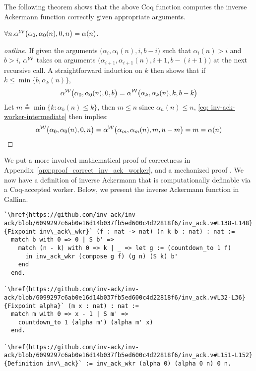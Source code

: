 The following theorem shows that the above Coq function computes the inverse Ackermann function correctly given appropriate arguments.
\begin{thm} \label{thm: inv-ack-worker-correct}
	$\forall n. \alpha^{\mathcal{W}}\big(\alpha_0, \alpha_0(n), 0, n\big) = \alpha(n)$.
\end{thm}
\begin{proof}[outline]
	If given the arguments $\big(\alpha_i, \alpha_i(n), i, b - i\big)$ such that $\alpha_i(n) > i$ and $b > i$, $\alpha^{\mathcal{W}}$ takes on arguments $\big(\alpha_{i+1}, \alpha_{i+1}(n), i+1, b - (i+1)\big)$ at the next recursive call. A straightforward induction on $k$ then shows that if $k\le \min\big\{b, \alpha_k(n)\big\}$, 
	\begin{equation} \label{eq: inv-ack-worker-intermediate}
	\alpha^{\mathcal{W}}\big(\alpha_0, \alpha_0(n), 0, b\big) = \alpha^{\mathcal{W}}\big(\alpha_k, \alpha_k(n), k, b-k\big)
	\end{equation}
	Let $m \triangleq \min\big\{k : \alpha_k(n) \le k \}$, then $m\le n$ since $\alpha_n(n)\le n$, \eqref{eq: inv-ack-worker-intermediate} then implies:
	$$ \alpha^{\mathcal{W}}\big(\alpha_0, \alpha_0(n), 0, n\big) = \alpha^{\mathcal{W}}\big(\alpha_m, \alpha_m(n), m, n - m\big) = m = \alpha(n) $$
\end{proof}
We put a more involved mathematical proof of correctness in Appendix~\ref{apx:proof_correct_inv_ack_worker}, and a mechanized proof .
We now have a definition of inverse Ackermann that is computationally 
definable via a Coq-accepted worker. Below, we present the inverse 
Ackermann function in Gallina.
\begin{lstlisting}
`\href{https://github.com/inv-ack/inv-ack/blob/6099297c6ab0e16d14b037fb5ed600c4d22818f6/inv_ack.v#L138-L148} {Fixpoint inv\_ack\_wkr}` (f : nat -> nat) (n k b : nat) : nat :=
  match b with 0 => 0 | S b' => 
    match (n - k) with 0 => k | _ => let g := (countdown_to 1 f) 
      in inv_ack_wkr (compose g f) (g n) (S k) b'
    end
  end.

`\href{https://github.com/inv-ack/inv-ack/blob/6099297c6ab0e16d14b037fb5ed600c4d22818f6/inv_ack.v#L32-L36}{Fixpoint alpha}` (m x : nat) : nat :=
  match m with 0 => x - 1 | S m' => 
    countdown_to 1 (alpha m') (alpha m' x)
  end.
  
`\href{https://github.com/inv-ack/inv-ack/blob/6099297c6ab0e16d14b037fb5ed600c4d22818f6/inv_ack.v#L151-L152}{Definition inv\_ack}` := inv_ack_wkr (alpha 0) (alpha 0 n) 0 n.
\end{lstlisting}

